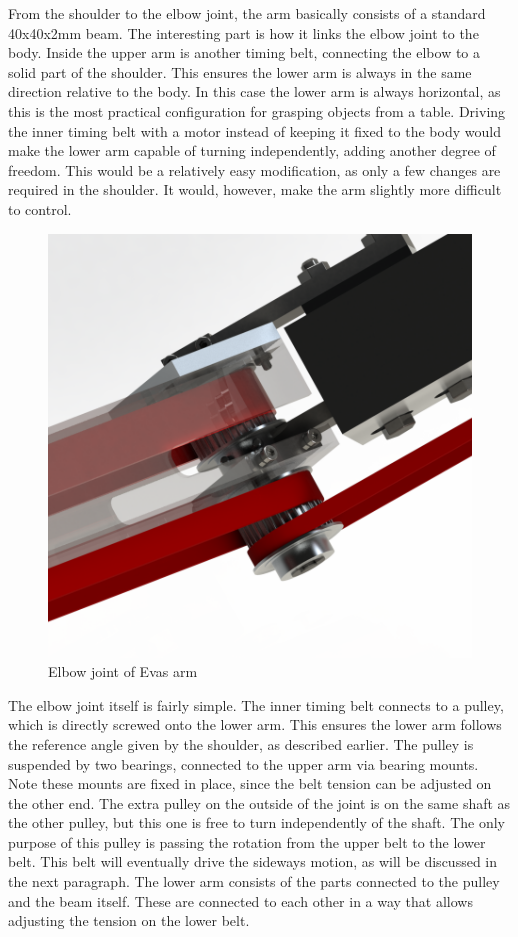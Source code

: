 \documentclass[technical_document.tex]{subfiles}
\begin{document}
From the shoulder to the elbow joint, the arm basically consists of a standard 40x40x2mm beam. The interesting part is how it links the elbow joint to the body. Inside the upper arm is another timing belt, connecting the elbow to a solid part of the shoulder. This ensures the lower arm is always in the same direction relative to the body. In this case the lower arm is always horizontal, as this is the most practical configuration for grasping objects from a table. Driving the inner timing belt with a motor instead of keeping it fixed to the body would make the lower arm capable of turning independently, adding another degree of freedom. This would be a relatively easy modification, as only a few changes are required in the shoulder. It would, however, make the arm slightly more difficult to control.

\begin{figure}[ht!]
	\centering
	\mbox{\includegraphics[scale=1.0]{Images/arm_elbow.png}}
	\caption{Elbow joint of Eva\textquotesingle{}s arm}
	\label{fig:arm_elbow}
\end{figure}

The elbow joint itself is fairly simple. The inner timing belt connects to a pulley, which is directly screwed onto the lower arm. This ensures the lower arm follows the reference angle given by the shoulder, as described earlier. The pulley is suspended by two bearings, connected to the upper arm via bearing mounts. Note these mounts are fixed in place, since the belt tension can be adjusted on the other end. The extra pulley on the outside of the joint is on the same shaft as the other pulley, but this one is free to turn independently of the shaft. The only purpose of this pulley is passing the rotation from the upper belt to the lower belt. This belt will eventually drive the sideways motion, as will be discussed in the next paragraph. The lower arm consists of the parts connected to the pulley and the beam itself. These are connected to each other in a way that allows adjusting the tension on the lower belt.
\end{document}
